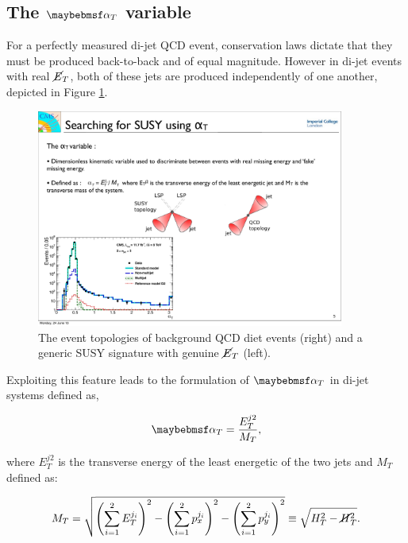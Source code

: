 \subsection{The $\alphat$ variable}
\label{subsec:alphatvariable}

For a perfectly measured di-jet QCD event, conservation laws dictate that they must be produced back-to-back and of equal magnitude. However in di-jet events with real $\met$, both of these jets are produced independently of one another, depicted in Figure \ref{fig:susytopology}.
\begin{figure}[!h]

\centering
\includegraphics[width=0.90\textwidth]{plots/susy_topology.pdf}
\caption[The event topologies of background QCD diet events (right) and a generic \ac{SUSY} signature with genuine $\met$ (left).]{The event topologies of background QCD diet events (right) and a generic \ac{SUSY} signature with genuine $\met$ (left).}  
\label{fig:susytopology}
\end{figure}

 Exploiting this feature leads to the formulation of $\alphat$ in di-jet systems defined as,

\begin{equation}
\alphat = \frac {E^{j2}_{T}}{M_{T}},
\end{equation} 

where $E^{j2}_{T}$ is the transverse energy of the least energetic of the two jets and $M_{T}$ defined as:

\begin{equation}
\label{eq:transmass}
M_{T} = \sqrt{\left(\sum^{2}_{i=1}E^{j_{i}}_{T}\right)^{2}-\left(\sum^{2}_{i=1}p^{j_{i}}_{x}\right)^{2}-\left(\sum^{2}_{i=1}p^{j_{i}}_{y}\right)^{2}} \equiv \sqrt{H_{T}^{2} - \cancel{H}_{T}^{2}} .
\end{equation}

